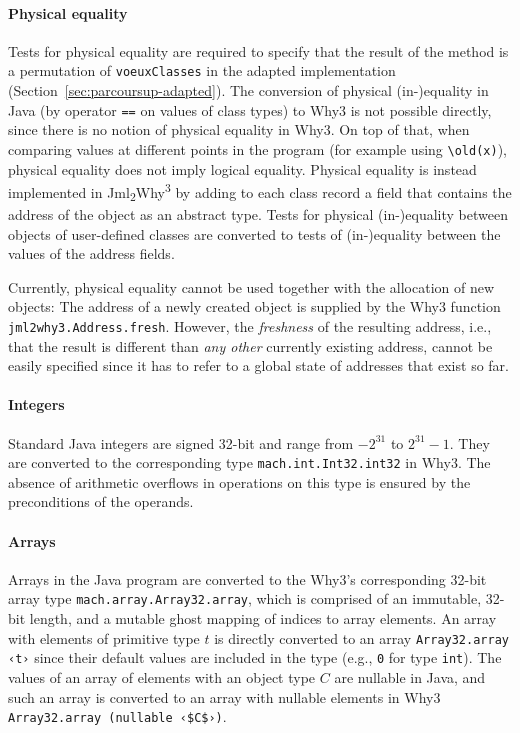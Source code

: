 \documentclass[a4paper]{report}
\newcommand{\cref}[1]{Section~\ref{#1}}
\newcommand{\jmlwhy}{\texorpdfstring{Jml\textsubscript{2}Why\textsuperscript{3}}{Jml2Why3}}
\begin{document}
\paragraph{Physical equality}

Tests for physical equality are required to specify that the result of the
method is a permutation of \texttt{voeuxClasses} in the adapted implementation
(\cref{sec:parcoursup-adapted}). The conversion of physical (in-)equality in
Java (by operator \lstinline{==} on values of class types) to Why3 is not
possible directly, since there is no notion of physical equality in Why3. On top
of that, when comparing values at different points in the program (for example
using \lstinline{\old(x)}), physical equality does not imply logical equality.
Physical equality is instead implemented in \jmlwhy{} by adding to each class
record a field that contains the address of the object as an abstract type.
Tests for physical (in-)equality between objects of user-defined classes are
converted to tests of (in-)equality between the values of the address fields.

Currently, physical equality cannot be used together with the allocation of new
objects: The address of a newly created object is supplied by the Why3 function
\lstinline{jml2why3.Address.fresh}. However, the \emph{freshness} of the
resulting address, i.e., that the result is different than \emph{any other}
currently existing address, cannot be easily specified since it has to refer to
a global state of addresses that exist so far.

\paragraph{Integers}
Standard Java integers are signed 32-bit and range from $-2^{31}$ to $2^{31}-1$.
They are converted to the corresponding type \texttt{mach.int.Int32.int32} in
Why3. The absence of arithmetic overflows in operations on this type is ensured
by the preconditions of the operands.

\paragraph{Arrays}
Arrays in the Java program are converted to the Why3's corresponding 32-bit
array type \lstinline{mach.array.Array32.array}, which is comprised of an
immutable, 32-bit length, and a mutable ghost mapping of indices to array
elements. An array with elements of primitive type $t$ is directly converted to
an array \lstinline{Array32.array ‹t›} since their default values are included in
the type (e.g., \texttt{0} for type \texttt{int}). The values of an array of
elements with an object type $C$ are nullable in Java, and such an array is
converted to an array with nullable elements in Why3 %
\lstinline{Array32.array (nullable ‹$C$›)}.
\end{document}
